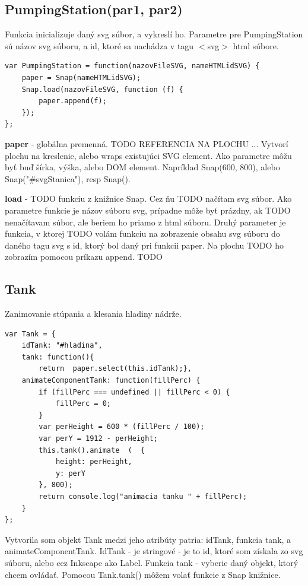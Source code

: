 \subsection{PumpingStation(par1, par2)}

Funkcia inicializuje daný svg súbor, a vykreslí ho. 
Parametre pre PumpingStation sú názov svg súboru, a id, ktoré sa nachádza v tagu $<$svg$>$ html súbore.

\begin{lstlisting}
var PumpingStation = function(nazovFileSVG, nameHTMLidSVG) {
	paper = Snap(nameHTMLidSVG);
	Snap.load(nazovFileSVG, function (f) {
		paper.append(f);
	});
};
\end{lstlisting}

\textbf{paper} - globálna premenná. TODO REFERENCIA NA PLOCHU ... Vytvorí plochu na  kreslenie, alebo  wraps existujúci SVG element. Ako parametre môžu byť buď šírka, výška, alebo DOM element. Napríklad Snap(600, 800), alebo Snap("\#svgStanica"), resp Snap(). 

\textbf{load} - TODO funkciu z knižnice Snap. Cez ňu TODO načítam  svg súbor. Ako parametre funkcie je názov súboru svg, prípadne môže byť prázdny, ak TODO nenačítavam súbor, ale beriem ho priamo z html súboru. Druhý parameter je funkcia, v ktorej TODO volám funkciu na zobrazenie obsahu svg súboru do daného tagu svg s  id, ktorý bol daný pri funkcii paper.  Na plochu TODO ho zobrazím pomocou príkazu append. TODO

\subsection{Tank}
Zanimovanie stúpania a klesania hladiny nádrže. 
\begin{lstlisting}
var Tank = {
	idTank: "#hladina",
	tank: function(){
		return  paper.select(this.idTank);},
	animateComponentTank: function(fillPerc) {
		if (fillPerc === undefined || fillPerc < 0) {
			fillPerc = 0;
		}
		var perHeight = 600 * (fillPerc / 100);
		var perY = 1912 - perHeight;
		this.tank().animate  (	{
			height: perHeight,
			y: perY
		}, 800);
		return console.log("animacia tanku " + fillPerc);
	}
};
\end{lstlisting}
Vytvorila som objekt Tank medzi jeho atribúty patria: idTank, funkcia tank, a animateComponentTank. IdTank - je stringové - je to id, ktoré som získala zo svg súboru, alebo cez Inkscape ako Label. Funkcia tank - vyberie daný objekt, ktorý chcem ovládať. Pomocou Tank.tank() môžem volať funkcie z Snap knižnice. 

